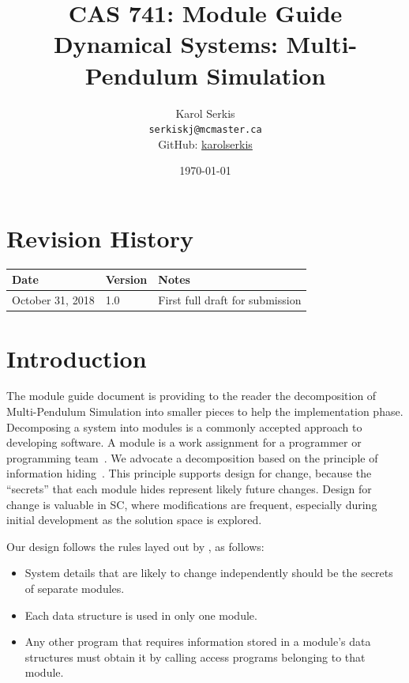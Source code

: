 \documentclass[12pt, titlepage]{article}
\newcommand{\progname}{Multi-Pendulum Simulation }
\begin{document}
\title{CAS 741: Module Guide\\[10pt]\Large Dynamical Systems: \progname}
\author{Karol Serkis\\\texttt{serkiskj@mcmaster.ca}\\GitHub:
\href{https://www.github.com/karolserkis}{karolserkis}}
\date{\today}

\maketitle


\section{Revision History}

\begin{tabularx}{\textwidth}{p{4cm}p{2cm}X}
\toprule {\bf Date} & {\bf Version} & {\bf Notes}\\
\midrule
October 31, 2018 & 1.0 &  First full draft for submission\\
\bottomrule
\end{tabularx}

\newpage

\tableofcontents

\listoftables

\listoffigures

\newpage


\section{Introduction}

The module guide document is providing to the reader the decomposition of \progname
 into smaller pieces to help the implementation phase.
Decomposing a system into modules is a commonly accepted approach to developing
software.  A module is a work assignment for a programmer or programming
team~\citep{ParnasEtAl1984}.  We advocate a decomposition
based on the principle of information hiding~\citep{Parnas1972a}.  This
principle supports design for change, because the ``secrets'' that each module
hides represent likely future changes.  Design for change is valuable in SC,
where modifications are frequent, especially during initial development as the
solution space is explored.  

Our design follows the rules layed out by \citet{ParnasEtAl1984}, as follows:
\begin{itemize}
\item System details that are likely to change independently should be the
  secrets of separate modules.
\item Each data structure is used in only one module.
\item Any other program that requires information stored in a module's data
  structures must obtain it by calling access programs belonging to that module.
\end{itemize}
\end{document}
